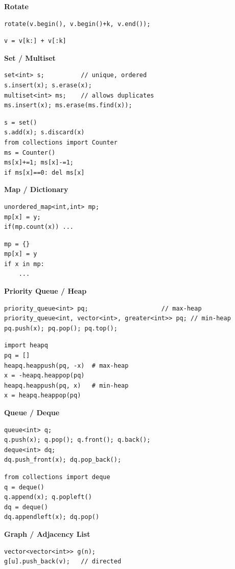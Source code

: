 \textbf{Rotate}
\begin{verbatim}
rotate(v.begin(), v.begin()+k, v.end());
\end{verbatim}

\begin{verbatim}
v = v[k:] + v[:k]
\end{verbatim}

\textbf{Set / Multiset}
\begin{verbatim}
set<int> s;          // unique, ordered
s.insert(x); s.erase(x);
multiset<int> ms;    // allows duplicates
ms.insert(x); ms.erase(ms.find(x));
\end{verbatim}

\begin{verbatim}
s = set()
s.add(x); s.discard(x)
from collections import Counter
ms = Counter()
ms[x]+=1; ms[x]-=1; 
if ms[x]==0: del ms[x]
\end{verbatim}

\textbf{Map / Dictionary}
\begin{verbatim}
unordered_map<int,int> mp;
mp[x] = y;
if(mp.count(x)) ...
\end{verbatim}

\begin{verbatim}
mp = {}
mp[x] = y
if x in mp:
    ...
\end{verbatim}

\textbf{Priority Queue / Heap}
\begin{verbatim}
priority_queue<int> pq;                    // max-heap
priority_queue<int, vector<int>, greater<int>> pq; // min-heap
pq.push(x); pq.pop(); pq.top();
\end{verbatim}

\begin{verbatim}
import heapq
pq = []
heapq.heappush(pq, -x)  # max-heap
x = -heapq.heappop(pq)
heapq.heappush(pq, x)   # min-heap
x = heapq.heappop(pq)
\end{verbatim}

\textbf{Queue / Deque}
\begin{verbatim}
queue<int> q;
q.push(x); q.pop(); q.front(); q.back();
deque<int> dq;
dq.push_front(x); dq.pop_back();
\end{verbatim}

\begin{verbatim}
from collections import deque
q = deque()
q.append(x); q.popleft()
dq = deque()
dq.appendleft(x); dq.pop()
\end{verbatim}

\textbf{Graph / Adjacency List}
\begin{verbatim}
vector<vector<int>> g(n);
g[u].push_back(v);   // directed
\end{verbatim}

